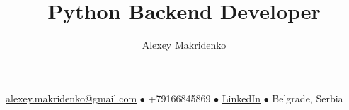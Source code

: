\documentclass[a4paper,12pt]{article} \raggedright
\makeatletter
\renewcommand{\maketitle}{
    {\Large\bfseries\theauthor}
    \vspace{.35em}

    {\bfseries\thetitle}

    \vspace{.25em}

    \underline{alexey.makridenko@gmail.com} {\scriptsize$\bullet$}
    +79166845869 {\scriptsize$\bullet$}
    \href{https://www.linkedin.com/in/makridenko/}{\underline{LinkedIn}} {\scriptsize$\bullet$}
    Belgrade, Serbia
}
\makeatother
\begin{document}
\author{Alexey Makridenko}
\title{Python Backend Developer}
\maketitle






\end{document}
